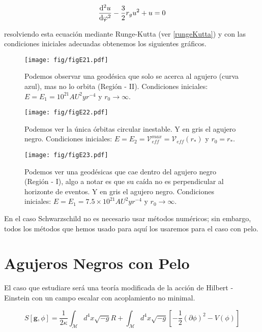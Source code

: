 \documentclass[../Main.tex]{subfiles}
\begin{document}
\begin{equation}
    \dv[2]{u}{\varphi}-\dfrac{3}{2}r_{g}u^{2}+u = 0
    \label{geodesicnull}
\end{equation}

resolviendo esta ecuación mediante Runge-Kutta (ver \ref{rungeKutta}) y con las condiciones iniciales adecuadas obtenemos los siguientes gráficos.

\begin{figure}[H]
    \centering
    \texttt{[image: fig/figE21.pdf]}
    \caption{Podemos observar una geodésica que solo se acerca al agujero (curva azul), mas no lo orbita (Región - II). Condiciones iniciales: $E=E_1=10^{21} AU^2 yr^{-4}$ y $r_0\rightarrow\infty$.}
    \label{null:acerca}
\end{figure}
\begin{figure}[H]
    \centering
    \texttt{[image: fig/figE22.pdf]}
    \caption{Podemos ver la única órbitas circular inestable. Y en gris el agujero negro. Condiciones iniciales: $E=E_2=\mathcal{V}_{eff}^{max}=\mathcal{V}_{eff}(r_*)$ y $r_0=r_{*}$.}
    \label{null:orbita}
\end{figure}

\begin{figure}[H]
    \centering
    \texttt{[image: fig/figE23.pdf]}
    \caption{Podemos ver una geodésicas que cae dentro del agujero negro (Región - I), algo a notar es que su caída no es perpendicular al horizonte de eventos. Y en gris el agujero negro. Condiciones iniciales: $E=E_1=7.5\times 10^{21} AU^2 yr^{-4}$ y $r_0\rightarrow\infty$.}
    \label{null:cae}
\end{figure}

En el caso Schwarzschild no es necesario usar métodos numéricos; sin embargo, todos los métodos que hemos usado para aquí los usaremos para el caso con pelo.

\section{Agujeros Negros con Pelo}
El caso que estudiare será una teoría modificada de la acción de Hilbert - Einstein con un campo escalar con acoplamiento no minimal.

\begin{equation}
        S[\textbf{g},\phi]=\frac{1}{2\kappa}\int_{\mathcal{M}}d^{4}x\sqrt{-g}{R}+\int_{\mathcal{M}}d^{4}x\sqrt{-g}\left[-\frac{1}{2}(\partial\phi)^{2}-V(\phi)\right]
        \label{action}
\end{equation}
\end{document}
